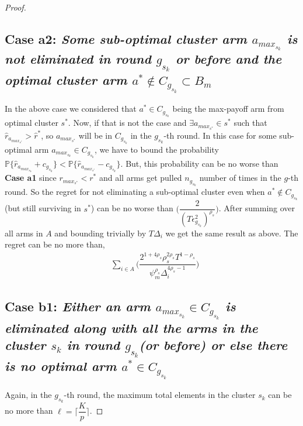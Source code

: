 \begin{proof}
\subsection*{Case a2: \textit{ Some sub-optimal cluster arm $a_{max_{s_{k}}}$ is not eliminated in round $g_{s_{k}}$ or before and the optimal cluster arm $a^{*}\notin C_{g_{s_{k}}} \subset B_{m}$ }}
	
	In the above case we considered that $a^{*}\in C_{g_{s_{k}}}$ being the max-payoff arm from optimal cluster $s^{*}$. Now, if that is not the case and $\exists a_{max_{s^{*}}}\in s^{*}$ such that $\hat{r}_{a_{max_{s^{*}}}}> \hat{r}^{*}$, so $a_{max_{s^{*}}}$ will be in $C_{g_{s_{k}}}$ in the $g_{s_{k}}$-th round. In this case for some sub-optimal arm $a_{max_{s_{k}}}\in C_{g_{s_{k}}}$, we have to bound the probability $\mathbb{P}\bigg\lbrace\hat{r}_{a_{max_{s_{k}}}}+c_{g_{s_{k}}}\bigg\rbrace< \mathbb{P}\bigg\lbrace\hat{r}_{a_{max_{s^{*}}}}-c_{g_{s_{k}}}\bigg\rbrace$. But, this probability can be no worse than \textbf{Case a1} since $r_{max_{s^{*}}} < r^{*}$ and all arms get pulled $n_{g_{s_{k}}}$ number of times in the $g$-th round. So the regret for not eliminating a sub-optimal cluster even when $a^{*}\notin C_{g_{s_{k}}}$(but still surviving in $s^{*}$) can be no worse than $\bigg(\dfrac{2}{(T\epsilon_{g_{s_{k}}}^{2})^{\rho_{s}}}\bigg)$. After summing over all arms in $A$ and bounding 
trivially by $T\Delta_{i}$ we get the same result as above. The regret can be no more than,
 \begin{align*}
 &\sum_{i\in A}\bigg(\dfrac{2^{1+4\rho_{s}}\rho_{s}^{2\rho_{s}}T^{1-\rho_{s}}}{\psi_{m}^{\rho_{s}}\Delta_{i}^{4\rho_{s}-1}}\bigg)
 \end{align*}


\subsection*{Case b1: \textit {Either an arm $a_{max_{s_{k}}}\in C_{g_{s_{k}}}$ is eliminated along with all the arms in the cluster $s_{k}$ in round $g_{s_{k}}$(or before) or else there is no optimal arm $a^{*}\in C_{g_{s_{k}}}$} }
	
	Again, in the $g_{s_{k}}$-th round, the maximum total elements in the cluster $s_{k}$ can be no more than $\ell=\bigg\lceil \dfrac{K}{p}\bigg\rceil$.
 

\end{proof}
